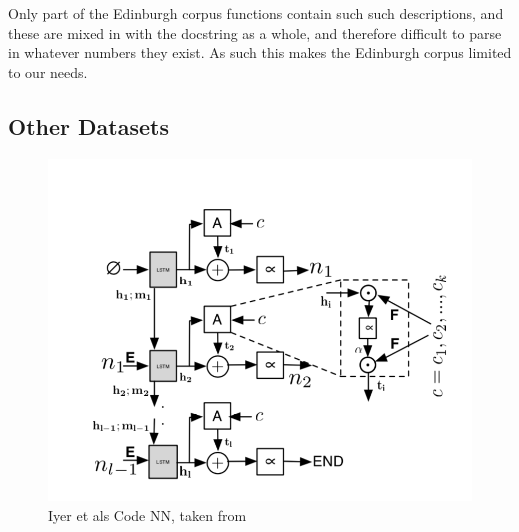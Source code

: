 Only part of the Edinburgh corpus functions contain such such descriptions, and these are mixed in with the docstring as a whole, and therefore difficult to parse in whatever numbers they exist.
As such this makes the Edinburgh corpus limited to our needs.


\subsection{Other Datasets}


\begin{figure}[tb]
    \centering
    \includegraphics[width=0.5\linewidth]{ModelPics/Iyer_etal.png}
    \caption{Iyer et als Code NN, taken from \cite{iyer_summarizing_2016}}
    \label{fig:Iyer}
\end{figure}



